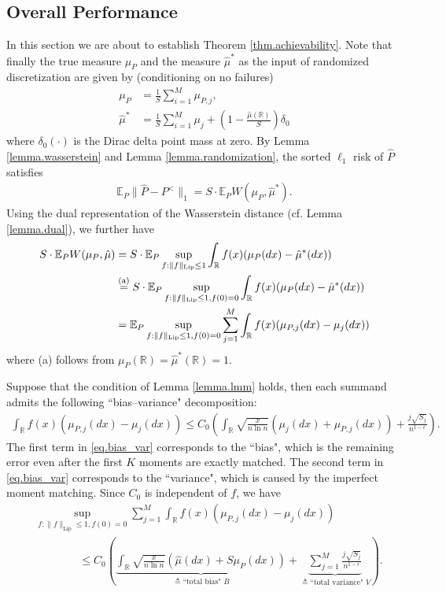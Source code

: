 \documentclass[final,12pt]{colt2018} %
\def \bE {\mathbb{E}}
\newcommand{\reals}{\mathbb{R}}
\newcommand{\stepa}[1]{\overset{\rm (a)}{#1}}
\begin{document}
\subsection{Overall Performance}
In this section we are about to establish Theorem \ref{thm.achievability}. Note that finally the true measure $\mu_P$ and the measure $\hat{\mu}^*$ as the input of randomized discretization are given by (conditioning on no failures)
\begin{align*}
\mu_P &= \frac{1}{S}\sum_{i=1}^M \mu_{P,j}, \\
\hat{\mu}^* &= \frac{1}{S}\sum_{i=1}^M \mu_j + \left(1-\frac{\hat{\mu}(\reals)}{S}\right)\delta_0
\end{align*}
where $\delta_0(\cdot)$ is the Dirac delta point mass at zero. By Lemma \ref{lemma.wasserstein} and Lemma \ref{lemma.randomization}, the sorted $\ell_1$ risk of $\hat{P}$ satisfies
\begin{align*}
\bE_P \|\hat{P}-P^<\|_1 = S\cdot\bE_P W(\mu_P,\hat{\mu}^*).
\end{align*}
Using the dual representation of the Wasserstein distance (cf. Lemma \ref{lemma.dual}), we further have
\begin{align}
S\cdot\bE_P W(\mu_P,\hat{\mu}) &= S\cdot \bE_P \sup_{f: \|f\|_{\text{Lip}}\le 1} \int_{\mathbb{R}} f(x)(\mu_P(dx) - \hat{\mu}^*(dx))\nonumber \\
&\stepa = S\cdot \bE_P \sup_{f: \|f\|_{\text{Lip}}\le 1, f(0)=0} \int_{\mathbb{R}} f(x)(\mu_P(dx) - \hat{\mu}^*(dx))\nonumber \\
&= \bE_P \sup_{f: \|f\|_{\text{Lip}}\le 1, f(0)=0} \sum_{j=1}^M \int_{\mathbb{R}} f(x)(\mu_{P,j}(dx) - \mu_j(dx)) \label{eq.final_risk}
\end{align}
where (a) follows from $\mu_P(\reals)=\hat{\mu}^*(\reals)=1$.

Suppose that the condition of Lemma \ref{lemma.lmm} holds, then each summand admits the following ``bias--variance" decomposition:
\begin{align}\label{eq.bias_var}
\int_{\mathbb{R}} f(x)(\mu_{P,j}(dx) - \mu_j(dx)) \le C_0\left(\int_{\mathbb{R}} \sqrt{\frac{x}{n\ln n}}(\mu_j(dx)+\mu_{P,j}(dx)) +  \frac{j\sqrt{S_j}}{n^{1-\epsilon}}\right).
\end{align}
The first term in \eqref{eq.bias_var} corresponds to the ``bias", which is the remaining error even after the first $K$ moments are exactly matched. The second term in \eqref{eq.bias_var} corresponds to the ``variance", which is caused by the imperfect moment matching. Since $C_0$ is independent of $f$, we have
\begin{align}
&\sup_{f: \|f\|_{\text{Lip}}\le 1, f(0)=0} \sum_{j=1}^M \int_{\mathbb{R}} f(x)(\mu_{P,j}(dx) - \mu_j(dx))\nonumber\\
& \qquad\qquad\le C_0\left(\underbrace{\int_{\mathbb{R}} \sqrt{\frac{x}{n\ln n}}(\hat{\mu}(dx)+S\mu_{P}(dx))}_{\triangleq \text{``total bias" } B} + \underbrace{\sum_{j=1}^M \frac{j\sqrt{S_j}}{n^{1-\epsilon}}}_{\triangleq \text{``total variance" } V}\right).\label{eq.total_bias_var}
\end{align}
\end{document}
